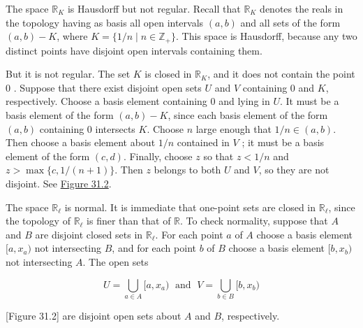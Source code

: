 \begin{centeredblock}
\begin{example}
\label{ex:\thesection.\theexample}
 The space \(\mathbb{R}_{K}\) is Hausdorff but not regular. Recall that \(\mathbb{R}_{K}\) denotes the reals in the topology having as basis all open intervals \((a, b)\) and all sets of the form \(( {a,b}) - K\), where \(K = \{ {1/n \mid n \in {\mathbb{Z}}_{ + }}\}\). This space is Hausdorff, because any two distinct points have disjoint open intervals containing them.

But it is not regular. The set \(K\) is closed in \(\mathbb{R}_{K}\), and it does not contain the point 0 . Suppose that there exist disjoint open sets \(U\) and \(V\) containing 0 and \(K\), respectively. Choose a basis element containing 0 and lying in \(U\). It must be a basis element of the form \(( {a,b}) - K\), since each basis element of the form \((a, b)\) containing 0 intersects \(K\). Choose \(n\) large enough that \(1/n \in ( {a,b})\). Then choose a basis element about \(1/n\) contained in \(V\) ; it must be a basis element of the form \((c, d)\). Finally, choose \(z\) so that \(z < 1/n\) and \(z > \max \{ c,1/( {n + 1}) \}\). Then \(z\) belongs to both \(U\) and \(V\), so they are not disjoint. See \hyperref[fig:31.2]{Figure 31.2}.
\end{example}
\end{centeredblock}

\begin{centeredblock}
\begin{example}
\label{ex:\thesection.\theexample}
 The space \(\mathbb{R}_{\ell }\) is normal. It is immediate that one-point sets are closed in \(\mathbb{R}_{\ell }\), since the topology of \(\mathbb{R}_{\ell }\) is finer than that of \(\mathbb{R}\). To check normality, suppose that \(A\) and \(B\) are disjoint closed sets in \(\mathbb{R}_{\ell }\). For each point \(a\) of \(A\) choose a basis element \([ {a,x_{a}})\) not intersecting \(B\), and for each point \(b\) of \(B\) choose a basis element \([ {b,x_{b}})\) not intersecting \(A\). The open sets

\[
U = \mathop{\bigcup }\limits_{{a \in A}}[ {a,x_{a}}) \;\text{ and }\;V = \mathop{\bigcup }\limits_{{b \in B}}[ {b,x_{b}})
\]

[Figure 31.2]
are disjoint open sets about \(A\) and \(B\), respectively.
\end{example}
\end{centeredblock}

